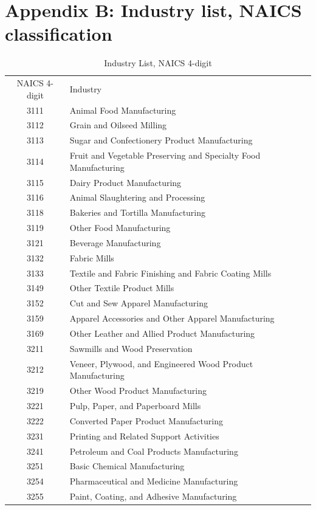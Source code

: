 \section{Appendix B: Industry list, NAICS classification}
\begin{spacing}{1}
\begin{longtable}{cl}
\caption{Industry List, NAICS 4-digit}\label{tab:naics4diglist}
NAICS 4-digit & Industry \\
3111 &	Animal Food Manufacturing \\
3112 &	Grain and Oilseed Milling \\
3113 &	Sugar and Confectionery Product Manufacturing \\
3114 &	Fruit and Vegetable Preserving and Specialty Food Manufacturing \\
3115 &	Dairy Product Manufacturing \\
3116 &	Animal Slaughtering and Processing \\
3118 &	Bakeries and Tortilla Manufacturing \\
3119 &	Other Food Manufacturing \\
3121 &	Beverage Manufacturing \\
3132 &	Fabric Mills \\
3133 &	Textile and Fabric Finishing and Fabric Coating Mills \\
3149 &	Other Textile Product Mills \\
3152 &	Cut and Sew Apparel Manufacturing \\
3159 &	Apparel Accessories and Other Apparel Manufacturing \\
3169 &	Other Leather and Allied Product Manufacturing \\
3211 &	Sawmills and Wood Preservation \\
3212 &	Veneer, Plywood, and Engineered Wood Product Manufacturing \\
3219 &	Other Wood Product Manufacturing \\
3221 &	Pulp, Paper, and Paperboard Mills \\
3222 &	Converted Paper Product Manufacturing \\
3231 &	Printing and Related Support Activities \\
3241 &	Petroleum and Coal Products Manufacturing \\
3251 &	Basic Chemical Manufacturing \\
3254 &	Pharmaceutical and Medicine Manufacturing \\
3255 &	Paint, Coating, and Adhesive Manufacturing \\

\end{longtable}
\end{spacing}
